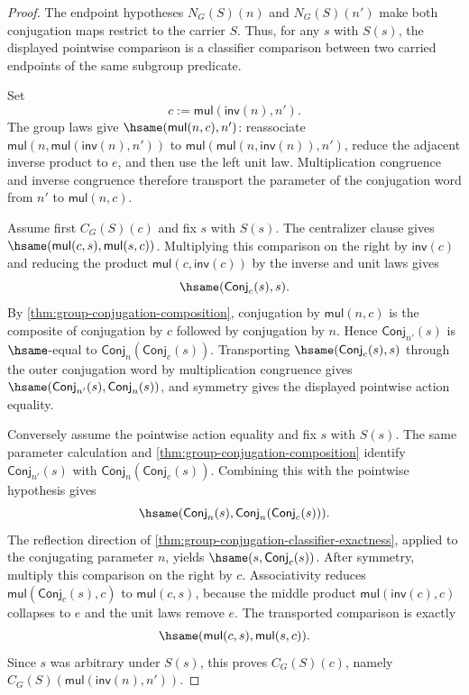 \begin{proof}
The endpoint hypotheses $N_G(S)(n)$ and $N_G(S)(n')$ make both conjugation
maps restrict to the carrier $S$. Thus, for any $s$ with $S(s)$, the displayed
pointwise comparison is a classifier comparison between two carried endpoints
of the same subgroup predicate.

Set
$$
c:=\mathsf{mul}(\mathsf{inv}(n),n').
$$
The group laws give $\hsame(\mathsf{mul}(n,c),n')$: reassociate
$\mathsf{mul}(n,\mathsf{mul}(\mathsf{inv}(n),n'))$ to
$\mathsf{mul}(\mathsf{mul}(n,\mathsf{inv}(n)),n')$, reduce the adjacent
inverse product to $e$, and then use the left unit law. Multiplication
congruence and inverse congruence therefore transport the parameter of the
conjugation word from $n'$ to $\mathsf{mul}(n,c)$.

Assume first $C_G(S)(c)$ and fix $s$ with $S(s)$. The centralizer clause gives
$\hsame(\mathsf{mul}(c,s),\mathsf{mul}(s,c))$. Multiplying this comparison on
the right by $\mathsf{inv}(c)$ and reducing the product
$\mathsf{mul}(c,\mathsf{inv}(c))$ by the inverse and unit laws gives
$$
\hsame(\mathsf{Conj}_c(s),s).
$$
By \autoref{thm:group-conjugation-composition}, conjugation by
$\mathsf{mul}(n,c)$ is the composite of conjugation by $c$ followed by
conjugation by $n$. Hence
$\mathsf{Conj}_{n'}(s)$ is $\hsame$-equal to
$\mathsf{Conj}_n(\mathsf{Conj}_c(s))$. Transporting
$\hsame(\mathsf{Conj}_c(s),s)$ through the outer conjugation word by
multiplication congruence gives
$\hsame(\mathsf{Conj}_{n'}(s),\mathsf{Conj}_n(s))$, and symmetry gives the
displayed pointwise action equality.

Conversely assume the pointwise action equality and fix $s$ with $S(s)$. The
same parameter calculation and \autoref{thm:group-conjugation-composition}
identify $\mathsf{Conj}_{n'}(s)$ with
$\mathsf{Conj}_n(\mathsf{Conj}_c(s))$. Combining this with the pointwise
hypothesis gives
$$
\hsame(\mathsf{Conj}_n(s),\mathsf{Conj}_n(\mathsf{Conj}_c(s))).
$$
The reflection direction of
\autoref{thm:group-conjugation-classifier-exactness}, applied to the
conjugating parameter $n$, yields $\hsame(s,\mathsf{Conj}_c(s))$. After
symmetry, multiply this comparison on the right by $c$. Associativity reduces
$\mathsf{mul}(\mathsf{Conj}_c(s),c)$ to $\mathsf{mul}(c,s)$, because the
middle product $\mathsf{mul}(\mathsf{inv}(c),c)$ collapses to $e$ and the
unit laws remove $e$. The transported comparison is exactly
$$
\hsame(\mathsf{mul}(c,s),\mathsf{mul}(s,c)).
$$
Since $s$ was arbitrary under $S(s)$, this proves $C_G(S)(c)$, namely
$C_G(S)(\mathsf{mul}(\mathsf{inv}(n),n'))$.
\end{proof}
